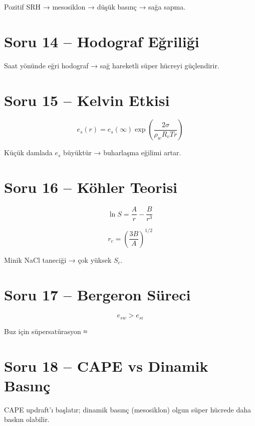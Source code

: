 \documentclass[12pt,a4paper]{article}
\begin{document}
Pozitif SRH → mesosiklon → düşük basınç → sağa sapma.

\section*{Soru 14 -- Hodograf Eğriliği}

Saat yönünde eğri hodograf → sağ hareketli süper hücreyi güçlendirir.

\section*{Soru 15 -- Kelvin Etkisi}

\[
e_s(r) = e_s(\infty) \exp\left(\frac{2\sigma}{\rho_w R_v T r}\right)
\]

Küçük damlada \(e_s\) büyüktür → buharlaşma eğilimi artar.

\section*{Soru 16 -- Köhler Teorisi}

\[
\ln S = \frac{A}{r} - \frac{B}{r^3}
\]

\[
r_c = \left(\frac{3B}{A}\right)^{1/2}
\]

Minik NaCl taneciği → çok yüksek \(S_c\).

\section*{Soru 17 -- Bergeron Süreci}

\[
e_{sw} > e_{si}
\]

Buz için süpersatürasyon ≈ %

\section*{Soru 18 -- CAPE vs Dinamik Basınç}

CAPE updraft'ı başlatır;  
dinamik basınç (mesosiklon) olgun süper hücrede daha baskın olabilir.
\end{document}
